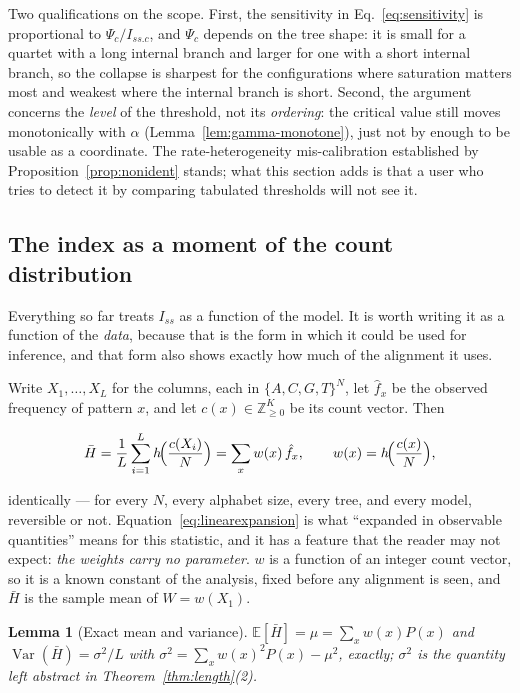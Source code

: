 \documentclass[11pt]{article}
\newcommand{\Iss}{I_{ss}}
\newcommand{\Issc}{I_{ss.c}}
\newcommand{\Hbar}{\bar H}
\newcommand{\E}{\mathbb{E}}
\newcommand{\Var}{\operatorname{Var}}
\newtheorem{lemma}[theorem]{Lemma}
\theoremstyle{definition}
\theoremstyle{remark}
\begin{document}
Two qualifications on the scope. First, the sensitivity in
Eq.~\eqref{eq:sensitivity} is proportional to $\Psi_c/\Issc$, and $\Psi_c$
depends on the tree shape: it is small for a quartet with a long internal
branch and larger for one with a short internal branch, so the collapse is
sharpest for the configurations where saturation matters most and weakest
where the internal branch is short. Second, the argument concerns the
\emph{level} of the threshold, not its \emph{ordering}: the critical value
still moves monotonically with $\alpha$ (Lemma~\ref{lem:gamma-monotone}), just
not by enough to be usable as a coordinate. The rate-heterogeneity
mis-calibration established by Proposition~\ref{prop:nonident} stands; what
this section adds is that a user who tries to detect it by comparing tabulated
thresholds will not see it.

\subsection{The index as a moment of the count distribution}
\label{sec:moment}

Everything so far treats $\Iss$ as a function of the model. It is worth
writing it as a function of the \emph{data}, because that is the form in
which it could be used for inference, and that form also shows exactly how
much of the alignment it uses.

Write $X_1,\dots,X_L$ for the columns, each in $\{A,C,G,T\}^N$, let
$\hat f_x$ be the observed frequency of pattern $x$, and let
$c(x)\in\mathbb Z_{\ge0}^{K}$ be its count vector. Then

\begin{equation}
  \Hbar=\frac1L\sum_{i=1}^L h\!\Bigl(\frac{c(X_i)}{N}\Bigr)
      =\sum_{x}w(x)\,\hat f_x,
  \qquad w(x)=h\!\Bigl(\frac{c(x)}{N}\Bigr),
  \label{eq:linearexpansion}
\end{equation}

identically --- for every $N$, every alphabet size, every tree, and every
model, reversible or not. Equation~\eqref{eq:linearexpansion} is what
``expanded in observable quantities'' means for this statistic, and it has a
feature that the reader may not expect: \emph{the weights carry no
parameter}. $w$ is a function of an integer count vector, so it is a known
constant of the analysis, fixed before any alignment is seen, and $\Hbar$ is
the sample mean of $W=w(X_1)$.

\begin{lemma}[Exact mean and variance]
\label{lem:moment}
$\E[\Hbar]=\mu=\sum_xw(x)P(x)$ and
$\Var(\Hbar)=\sigma^2/L$ with
$\sigma^2=\sum_xw(x)^2P(x)-\mu^2$, exactly; $\sigma^2$ is the quantity left
abstract in Theorem~\ref{thm:length}(2).
\end{lemma}
\end{document}
